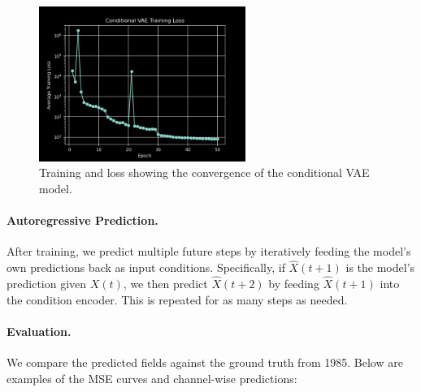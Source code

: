 \documentclass{article}
\begin{document}
\begin{figure}[ht]
    \centering
    \includegraphics[width=0.6\textwidth]{../loss/cond_vae_loss_curve_20250321-061452.png}
    \caption{Training and loss showing the convergence of the conditional VAE model.}
    \label{fig:cond_vae_loss}
\end{figure}

\FloatBarrier

\paragraph{Autoregressive Prediction.}
After training, we predict multiple future steps by iteratively feeding the model’s own predictions back as input conditions. Specifically, if \(\hat{X}(t+1)\) is the model’s prediction given \(X(t)\), we then predict \(\hat{X}(t+2)\) by feeding \(\hat{X}(t+1)\) into the condition encoder. This is repeated for as many steps as needed.

\paragraph{Evaluation.}
We compare the predicted fields against the ground truth from 1985. Below are examples of the MSE curves and channel-wise predictions:
\end{document}
